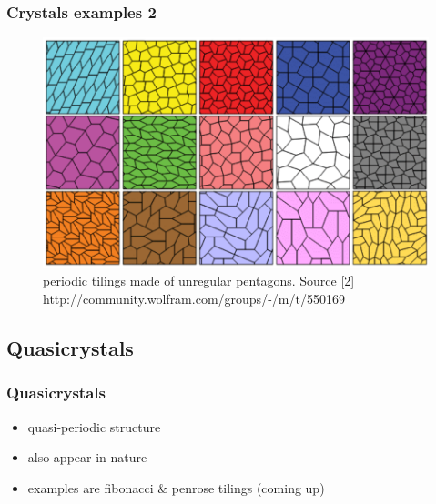 \documentclass[]{beamer}
\begin{document}
\begin{frame}
  \frametitle{Crystals examples 2}
  \begin{figure}
    \centering
        \includegraphics[width=1\textwidth]{assets/unregularTilings.png}
        \caption{periodic tilings made of unregular pentagons. Source [2] http://community.wolfram.com/groups/-/m/t/550169}
        \label{fig:periodicTilings2}
    \end{figure}
\end{frame}
\begin{frame}
  \subsection{Quasicrystals}
  \frametitle{Quasicrystals}
  \begin{itemize}
    \item quasi-periodic structure
    \item also appear in nature
    \item examples are fibonacci \& penrose tilings (coming up)
  \end{itemize}
\end{frame}
\end{document}

